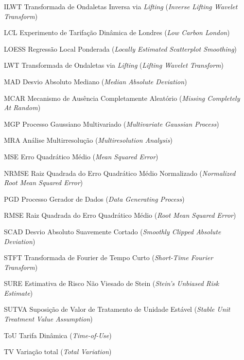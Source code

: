 \documentclass[
  oldfontcommands,
  sumario=tradicional,
  12pt,      %
  openright,    %
  oneside,    %
  a4paper,    %
  english,    %
  brazilian      %
]{imecc-unicamp}
\begin{document}
\begin{siglas}
  \item[ILWT] Transformada de Ondaletas Inversa via \emph{Lifting} (\emph{Inverse Lifting Wavelet Transform})
  \item[LCL] Experimento de Tarifação Dinâmica de Londres (\emph{Low Carbon London})
  \item[LOESS] Regressão Local Ponderada (\emph{Locally Estimated Scatterplot Smoothing})
  \item[LWT] Transformada de Ondaletas via \emph{Lifting} (\emph{Lifting Wavelet Transform})
  \item[MAD] Desvio Absoluto Mediano (\emph{Median Absolute Deviation})
  \item[MCAR] Mecanismo de Ausência Completamente Aleatório (\emph{Missing Completely At Random})
  \item[MGP] Processo Gaussiano Multivariado (\emph{Multivariate Gaussian Process})
  \item[MRA] Análise Multirresolução (\emph{Multiresolution Analysis})
  \item[MSE] Erro Quadrático Médio (\emph{Mean Squared Error})
  \item[NRMSE] Raiz Quadrada do Erro Quadrático Médio Normalizado (\emph{Normalized Root Mean Squared Error})
  \item[PGD] Processo Gerador de Dados (\emph{Data Generating Process}) 
  \item[RMSE] Raiz Quadrada do Erro Quadrático Médio (\emph{Root Mean Squared Error})
  \item[SCAD] Desvio Absoluto Suavemente Cortado (\emph{Smoothly Clipped Absolute Deviation})
  \item[STFT] Transformada de Fourier de Tempo Curto (\emph{Short-Time Fourier Transform})
  \item[SURE] Estimativa de Risco Não Viesado de Stein (\emph{Stein's Unbiased Risk Estimate})
  \item[SUTVA] Suposição de Valor de Tratamento de Unidade Estável (\emph{Stable Unit Treatment Value Assumption})
  \item[ToU] Tarifa Dinâmica (\emph{Time-of-Use})
  \item[TV] Variação total (\emph{Total Variation}) 
\end{siglas}
\end{document}
